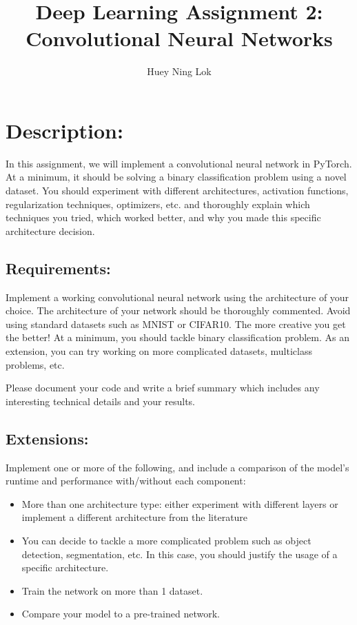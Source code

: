 \documentclass[11pt]{article}
\title{Deep Learning Assignment 2: Convolutional Neural Networks}
\author{Huey Ning Lok}
\providecommand{\tightlist}{%
      \setlength{\itemsep}{0pt}\setlength{\parskip}{0pt}}
\begin{document}
    
    
    \maketitle
    
    

    
    \section{Description:}\label{description}

In this assignment, we will implement a convolutional neural network in
PyTorch. At a minimum, it should be solving a binary classification
problem using a novel dataset. You should experiment with different
architectures, activation functions, regularization techniques,
optimizers, etc. and thoroughly explain which techniques you tried,
which worked better, and why you made this specific architecture
decision.

\subsection{Requirements:}\label{requirements}

Implement a working convolutional neural network using the architecture
of your choice. The architecture of your network should be thoroughly
commented. Avoid using standard datasets such as MNIST or CIFAR10. The
more creative you get the better! At a minimum, you should tackle binary
classification problem. As an extension, you can try working on more
complicated datasets, multiclass problems, etc.

Please document your code and write a brief summary which includes any
interesting technical details and your results.

\subsection{Extensions:}\label{extensions}

Implement one or more of the following, and include a comparison of the
model's runtime and performance with/without each component:

\begin{itemize}
\tightlist
\item
  More than one architecture type: either experiment with different
  layers or implement a different architecture from the literature
\item
  You can decide to tackle a more complicated problem such as object
  detection, segmentation, etc. In this case, you should justify the
  usage of a specific architecture.
\item
  Train the network on more than 1 dataset.
\item
  Compare your model to a pre-trained network.
\end{itemize}
\end{document}
